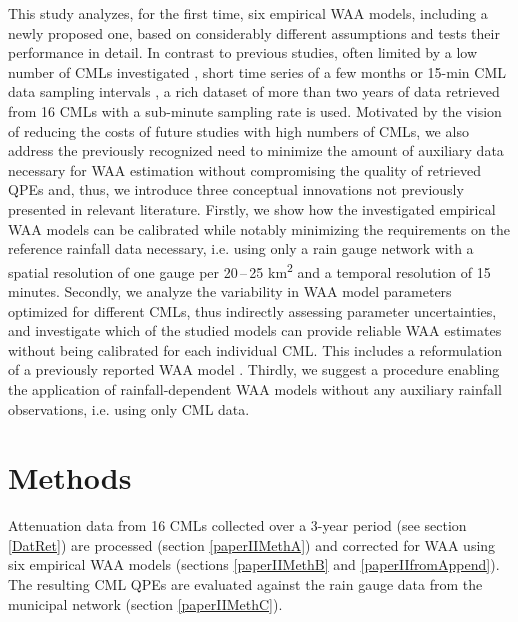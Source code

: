 \documentclass{ctuthesis}\usepackage[]{graphicx}\usepackage[]{color}
\begin{document}
This study analyzes, for the first time, six empirical WAA models, including a newly proposed one, based on considerably different assumptions and tests their performance in detail. In contrast to previous studies, often limited by a low number of CMLs investigated \citep{schleissQuantificationModelingWetAntenna2013, leijnseMicrowaveLinkRainfall2008, lethMeasurementCampaignAssess2018}, short time series of a few months \citep{leijnseMicrowaveLinkRainfall2008, overeemMeasuringUrbanRainfall2011, roversiCommercialMicrowaveLinks2020} or 15-min CML data sampling intervals \citep{overeemMeasuringUrbanRainfall2011, riosgaonaRainfallRetrievalCommercial2018}, a rich dataset of more than two years of data retrieved from 16 CMLs with a sub-minute sampling rate is used. Motivated by the vision of reducing the costs of future studies with high numbers of CMLs, we also address the previously recognized need \citep{ostrometzkyWetAntennaEffectFactor2018, grafRainfallEstimationGermanwide2020} to minimize the amount of auxiliary data necessary for WAA estimation without compromising the quality of retrieved QPEs and, thus, we introduce three conceptual innovations not previously presented in relevant literature. Firstly, we show how the investigated empirical WAA models can be calibrated while notably minimizing the requirements on the reference rainfall data necessary, i.e. using only a rain gauge network with a spatial resolution of one gauge per 20\,--\,25 km\textsuperscript{2} and a temporal resolution of 15 minutes. Secondly, we analyze the variability in WAA model parameters optimized for different CMLs, thus indirectly assessing parameter uncertainties, and investigate which of the studied models can provide reliable WAA estimates without being calibrated for each individual CML. This includes a reformulation of a previously reported WAA model \citep{valtrExcessAttenuationCaused2019}. Thirdly, we suggest a procedure enabling the application of rainfall-dependent WAA models without any auxiliary rainfall observations, i.e. using only CML data.

 
\section{Methods} \label{paperIIMeth}

Attenuation data from 16 CMLs collected over a 3-year period (see section \ref{DatRet}) are processed (section \ref{paperIIMethA}) and corrected for WAA using six empirical WAA models (sections \ref{paperIIMethB} and \ref{paperIIfromAppend}). The resulting CML QPEs are evaluated against the rain gauge data from the municipal network (section \ref{paperIIMethC}). 
\end{document}
